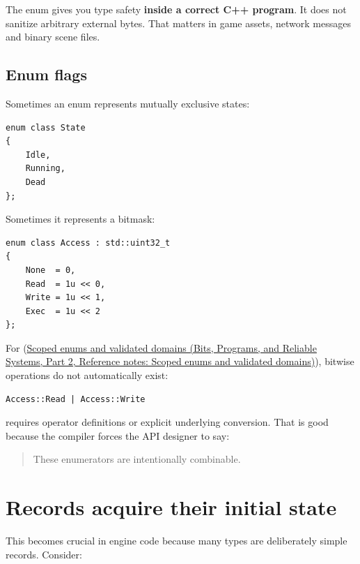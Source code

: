 The enum gives you type safety \textbf{inside a correct C++ program}. It does not sanitize arbitrary external bytes. That matters in game assets, network messages and binary scene files.

\subsection{Enum flags}\label{05-engine-i-ch003-enum-flags}

\hypertarget{05-engine-i-ch003-enum-flags}{}

Sometimes an enum represents mutually exclusive states:

\begin{verbatim}
enum class State
{
    Idle,
    Running,
    Dead
};
\end{verbatim}

Sometimes it represents a bitmask:

\begin{verbatim}
enum class Access : std::uint32_t
{
    None  = 0,
    Read  = 1u << 0,
    Write = 1u << 1,
    Exec  = 1u << 2
};
\end{verbatim}

For  (\href{../01-Bits-Programs-and-Reliable-Systems-P02/main.pdf\#nameddest=appendix-23640fcee147}{Scoped enums and validated domains (Bits, Programs, and Reliable Systems, Part 2, Reference notes: Scoped enums and validated domains)}), bitwise operations do not automatically exist:

\begin{verbatim}
Access::Read | Access::Write
\end{verbatim}

requires operator definitions or explicit underlying conversion. That is good because the compiler forces the API designer to say:

\begin{quote}
These enumerators are intentionally combinable.
\end{quote}

\section{Records acquire their initial state}\label{05-engine-i-ch003-records-acquire-their-initial-state}

\hypertarget{05-engine-i-ch003-records-acquire-their-initial-state}{}

This becomes crucial in engine code because many types are deliberately simple records. Consider:

